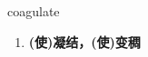 
\begin{frame}
{\huge coagulate}
\begin{center}
\begin{enumerate}\Large
  \item \textbf{(使)凝结，(使)变稠}
\end{enumerate}
\end{center}
\end{frame}
